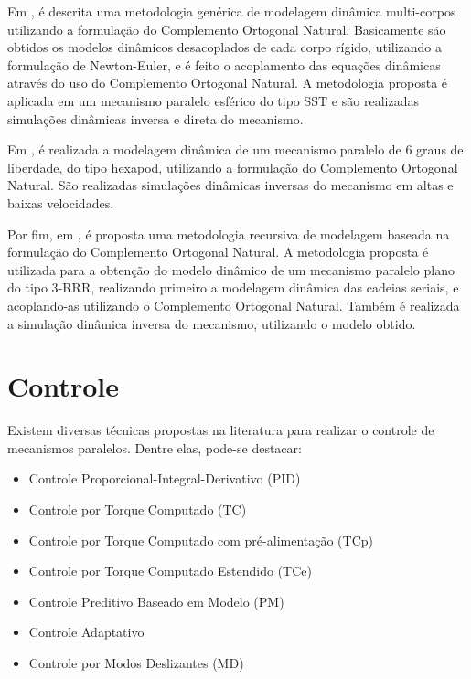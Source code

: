 \documentclass[]{politex}
\begin{document}
Em \cite{Akbarzadeh}, é descrita uma metodologia genérica de modelagem dinâmica multi-corpos utilizando a formulação do Complemento Ortogonal Natural. Basicamente são obtidos os modelos dinâmicos desacoplados de cada corpo rígido, utilizando a formulação de Newton-Euler, e é feito o acoplamento das equações dinâmicas através do uso do Complemento Ortogonal Natural. A metodologia proposta é aplicada em um mecanismo paralelo esférico do tipo SST e são realizadas simulações dinâmicas inversa e direta do mecanismo.

Em \cite{Xi}, é realizada a modelagem dinâmica de um mecanismo paralelo de 6 graus de liberdade, do tipo hexapod, utilizando a formulação do Complemento Ortogonal Natural. São realizadas simulações dinâmicas inversas do mecanismo em altas e baixas velocidades.

Por fim, em \cite{Khan}, é proposta uma metodologia recursiva de modelagem baseada na formulação do Complemento Ortogonal Natural. A metodologia proposta é utilizada para a obtenção do modelo dinâmico de um mecanismo paralelo plano do tipo 3-RRR, realizando primeiro a modelagem dinâmica das cadeias seriais, e acoplando-as utilizando o Complemento Ortogonal Natural. Também é realizada a simulação dinâmica inversa do mecanismo, utilizando o modelo obtido.









\section{Controle}

Existem diversas técnicas propostas na literatura para realizar o controle de mecanismos paralelos. Dentre elas, pode-se destacar:

\begin{itemize}
\item Controle Proporcional-Integral-Derivativo (PID)
\item Controle por Torque Computado (TC)
\item Controle por Torque Computado com pré-alimentação (TCp)
\item Controle por Torque Computado Estendido (TCe)
\item Controle Preditivo Baseado em Modelo (PM)
\item Controle Adaptativo
\item Controle por Modos Deslizantes (MD)
\end{itemize}
\end{document}
